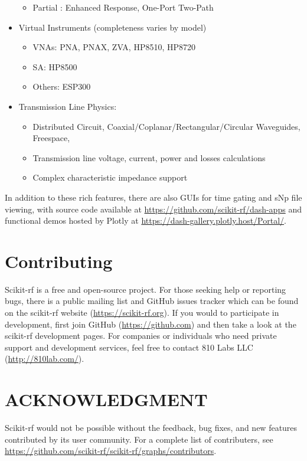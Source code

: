 \documentclass[journal, onecolumn]{IEEEtran}
\begin{document}
\begin{itemize}
\begin{itemize}
		\item Partial : Enhanced Response, One-Port Two-Path
	\end{itemize}
\item	Virtual Instruments (completeness varies by model)
	\begin{itemize}
		\item VNAs: PNA, PNAX, ZVA, HP8510, HP8720
		\item SA: HP8500
		\item Others: ESP300
	\end{itemize}
\item	Transmission Line Physics:
	\begin{itemize}
		\item Distributed Circuit, Coaxial/Coplanar/Rectangular/Circular Waveguides, Freespace, 
		\item Transmission line voltage, current, power and losses calculations
		\item Complex characteristic impedance support
	\end{itemize}

\end{itemize}

In addition to these rich features, there are also GUIs for time gating and sNp file viewing, with source code available at \url{https://github.com/scikit-rf/dash-apps} and functional demos hosted by Plotly at \url{https://dash-gallery.plotly.host/Portal/}. 

\section{Contributing}
Scikit-rf is a free and open-source project. For those seeking help or reporting bugs, there is a public mailing list and GitHub issues tracker which can be found on the scikit-rf website (\url{https://scikit-rf.org}). If you would to participate in development, first join GitHub (\url{https://github.com}) and then take a look at the scikit-rf development pages. For companies or individuals who need private support and development services, feel free to contact 810 Labs LLC (\url{http://810lab.com/}).

\section*{ACKNOWLEDGMENT}
Scikit-rf would not be possible without the feedback, bug fixes, and new features contributed by its user community. For a complete list of contributers, see \url{https://github.com/scikit-rf/scikit-rf/graphs/contributors}.


%


\end{document}
